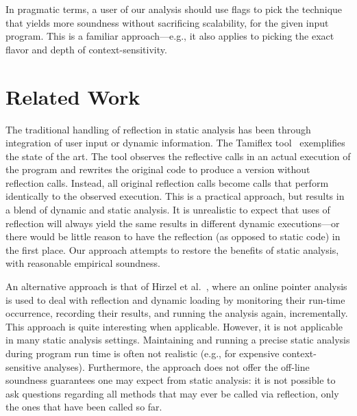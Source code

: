 


In pragmatic terms, a user of our analysis should use flags to pick
the technique that yields more soundness without sacrificing
scalability, for the given input program. This is a familiar
approach---e.g., it also applies to picking the exact flavor and depth
of context-sensitivity.




\section{Related Work}
\label{reflection/sec:related}

The traditional handling of reflection in static analysis has been
through integration of user input or dynamic information.  The
Tamiflex tool~\cite{icse/BoddenSSOM11} exemplifies the state of the
art. The tool observes the reflective calls in an actual execution of
the program and rewrites the original code to produce a version
without reflection calls. Instead, all original reflection calls
become calls that perform identically to the observed execution. This
is a practical approach, but results in a blend of dynamic and static
analysis.
It is unrealistic to expect that uses of reflection will always yield
the same results in different dynamic executions---or there would be
little reason to have the reflection (as opposed to static code) in
the first place. Our approach attempts to restore the benefits of
static analysis, with reasonable empirical soundness.

An alternative approach is that of Hirzel et
al.~\cite{ecoop/HirzelDH04,toplas/HirzelDDH07}, where an online
pointer analysis is used to deal with reflection and dynamic loading
by monitoring their run-time occurrence, recording their results, and
running the analysis again, incrementally. This approach is quite
interesting when applicable. However, it is not applicable in many
static analysis settings. Maintaining and running a precise static
analysis during program run time is often not realistic (e.g., for
expensive context-sensitive analyses). Furthermore, the approach does
not offer the off-line soundness guarantees one may expect from static
analysis: it is not possible to ask questions regarding all methods
that may ever be called via reflection, only the ones that have been
called so far.

